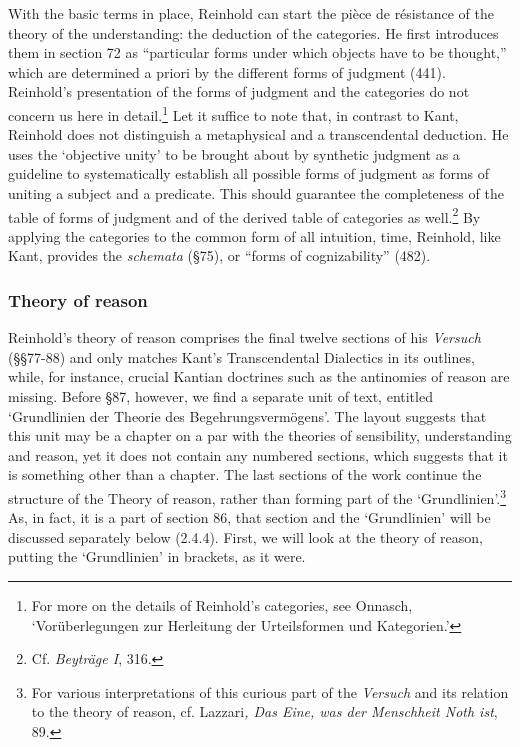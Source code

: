  With the basic terms in place, Reinhold can start the pi\`{e}ce de r\'{e}sistance of the theory of the understanding: the deduction of the categories. He first introduces them in section 72 as ``particular forms under which objects have to be thought,'' which are determined a priori by the different forms of judgment (441). Reinhold's presentation of the forms of judgment and the categories do not concern us here in detail.\footnote{ For more on the details of Reinhold's categories, see Onnasch, `Vor\"{u}berlegungen zur Herleitung der Urteilsformen und Kategorien.' } Let it suffice to note that, in contrast to Kant, Reinhold does not distinguish a metaphysical and a transcendental deduction. He uses the `objective unity' to be brought about by synthetic judgment as a guideline to systematically establish all possible forms of judgment as forms of uniting a subject and a predicate. This should guarantee the completeness of the table of forms of judgment and of the derived table of categories as well.\footnote{Cf. \textit{Beytr\"{a}ge I}, 316. } By applying the categories to the common form of all intuition, time, Reinhold, like Kant, provides the \textit{schemata} (\S  75), or ``forms of cognizability'' (482). 


\subsubsection{Theory of reason}


Reinhold's theory of reason comprises the final twelve sections of his \textit{Versuch} (\S \S  77{-}88) and only matches Kant's Transcendental Dialectics in its outlines, while, for instance, crucial Kantian doctrines such as the antinomies of reason are missing. Before \S  87, however, we find a separate unit of text, entitled `Grundlinien der Theorie des Begehrungsverm\"{o}gens'. The layout suggests that this unit may be a chapter on a par with the theories of sensibility, understanding and reason, yet it does not contain any numbered sections, which suggests that it is something other than a chapter. The last sections of the work continue the structure of the Theory of reason, rather than forming part of the `Grundlinien'.\footnote{ For various interpretations of this curious part of the \textit{Versuch} and its relation to the theory of reason, cf. Lazzari\textit{, Das Eine, was der Menschheit Noth ist}, 89. } As, in fact, it is a part of section 86, that section and the `Grundlinien' will be discussed separately below (2.4.4). First, we will look at the theory of reason, putting the `Grundlinien' in brackets, as it were. 

